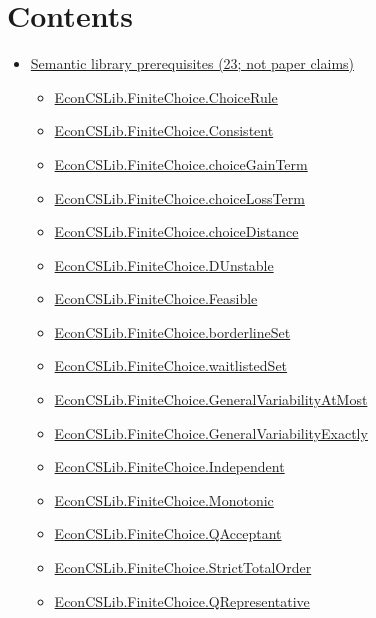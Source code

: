 \documentclass[10pt]{article}
\begin{document}
\section*{Contents}
\begin{itemize}[leftmargin=1.2em]
\item \hyperlink{library-section-bee5354f1438f98f}{Semantic library prerequisites (23; not paper claims)}
\begin{itemize}[leftmargin=1.2em]
\item \hyperlink{library-prerequisite-aebe54633da60351}{EconCSLib.FiniteChoice.ChoiceRule}
\item \hyperlink{library-prerequisite-c51ffba76c13d204}{EconCSLib.FiniteChoice.Consistent}
\item \hyperlink{library-prerequisite-e66298c8dac25baa}{EconCSLib.FiniteChoice.choiceGainTerm}
\item \hyperlink{library-prerequisite-ba6c40008598cadf}{EconCSLib.FiniteChoice.choiceLossTerm}
\item \hyperlink{library-prerequisite-66d5b4a54f47387c}{EconCSLib.FiniteChoice.choiceDistance}
\item \hyperlink{library-prerequisite-29c4c5d3d08823af}{EconCSLib.FiniteChoice.DUnstable}
\item \hyperlink{library-prerequisite-542ade70cc681808}{EconCSLib.FiniteChoice.Feasible}
\item \hyperlink{library-prerequisite-ac076d846344765a}{EconCSLib.FiniteChoice.borderlineSet}
\item \hyperlink{library-prerequisite-84ef92453e2eeb0e}{EconCSLib.FiniteChoice.waitlistedSet}
\item \hyperlink{library-prerequisite-5f0109fb4b0fbb5d}{EconCSLib.FiniteChoice.GeneralVariabilityAtMost}
\item \hyperlink{library-prerequisite-94743536b7e3fe31}{EconCSLib.FiniteChoice.GeneralVariabilityExactly}
\item \hyperlink{library-prerequisite-0de9dc90c34c9fb6}{EconCSLib.FiniteChoice.Independent}
\item \hyperlink{library-prerequisite-8ee5c1a19c8d4e3a}{EconCSLib.FiniteChoice.Monotonic}
\item \hyperlink{library-prerequisite-f02e4b75ca5571bf}{EconCSLib.FiniteChoice.QAcceptant}
\item \hyperlink{library-prerequisite-88c2ddc1c549c716}{EconCSLib.FiniteChoice.StrictTotalOrder}
\item \hyperlink{library-prerequisite-286eac89d49c4d81}{EconCSLib.FiniteChoice.QRepresentative}

\end{itemize}
\end{itemize}
\end{document}
